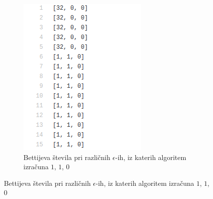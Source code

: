\documentclass[a4paper,11pt]{article}
\begin{document}
\begin{figure}[h!]
        \begin{subfigure}[b]{0.2\linewidth}
          \includegraphics[width=\linewidth]{circle_betti.png}
          \caption{Bettijeva števila pri različnih $\epsilon$-ih, iz katerih algoritem izračuna $1$, $1$, $0$}
        \end{subfigure}
        
      \end{figure}
      
\end{document}
